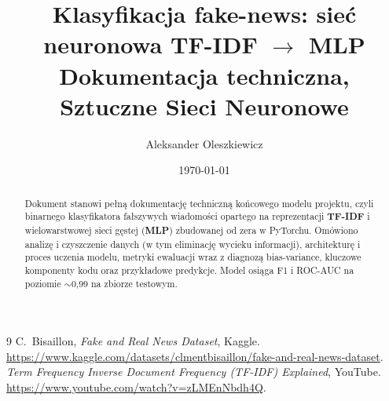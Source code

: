 \documentclass[11pt,a4paper]{article}
\title{\textbf{Klasyfikacja fake-news: sieć neuronowa TF-IDF $\rightarrow$ MLP}\\[0.3em]
\large Dokumentacja techniczna, Sztuczne Sieci Neuronowe}
\author{Aleksander Oleszkiewicz}
\date{\today}
\begin{document}
\maketitle
\begin{abstract}
\noindent
Dokument stanowi pełną dokumentację techniczną końcowego modelu projektu,
czyli binarnego klasyfikatora fałszywych wiadomości opartego na reprezentacji
\textbf{TF-IDF} i wielowarstwowej sieci gęstej (\textbf{MLP}) zbudowanej od zera
w PyTorchu. Omówiono
analizę i czyszczenie danych (w tym eliminację wycieku informacji), architekturę i
proces uczenia modelu, metryki ewaluacji wraz z diagnozą bias-variance, kluczowe
komponenty kodu oraz przykładowe predykcje. Model osiąga F1 i ROC-AUC na poziomie
$\sim$0{,}99 na zbiorze testowym.
\end{abstract}

\tableofcontents
\vspace{1em}









\begin{thebibliography}{9}
 C.~Bisaillon, \emph{Fake and Real News Dataset}, Kaggle.
  \url{https://www.kaggle.com/datasets/clmentbisaillon/fake-and-real-news-dataset}.
 \emph{Term Frequency Inverse Document Frequency (TF-IDF) Explained}, YouTube.
  \url{https://www.youtube.com/watch?v=zLMEnNbdh4Q}.
\end{thebibliography}
\end{document}
